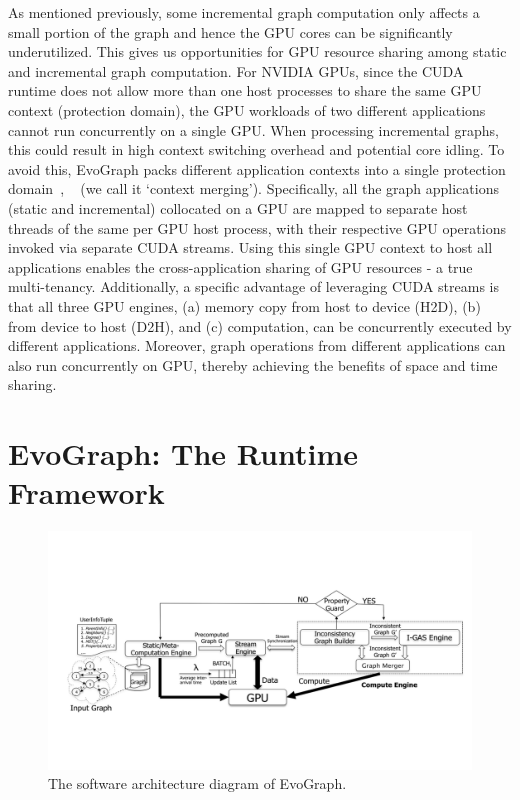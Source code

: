 As mentioned previously, some incremental graph computation only affects a small portion of the graph and hence the GPU cores can be significantly underutilized. This gives us opportunities for GPU resource sharing among static and incremental graph computation. For NVIDIA GPUs, since the CUDA runtime does not allow more than one host processes to share the same GPU context (protection domain), the GPU workloads of two different applications cannot run concurrently on a single GPU. When processing incremental graphs, this could result in high context switching overhead and potential core idling. To avoid this, EvoGraph packs different application contexts into a single protection domain~\cite{Rain}, ~\cite{Strings} (we call it `context merging'). Specifically, all the graph applications (static and incremental) collocated on a GPU are mapped to separate host threads of the same per GPU host process, with their respective GPU operations invoked via separate CUDA streams. Using this single GPU context to host all applications enables the cross-application sharing of GPU resources - a true multi-tenancy. Additionally, a specific advantage of leveraging CUDA streams is that all three GPU engines, (a) memory copy from host to device (H2D), (b) from device to host (D2H), and (c) computation, can be concurrently executed by different applications. Moreover, graph operations from different applications can also run concurrently on GPU, thereby achieving the benefits of space and time sharing. 


\section{EvoGraph: The Runtime Framework}

\begin{figure}[!t]
\centering
\includegraphics[width=\textwidth,height=\textheight,keepaspectratio]{figures/framework.pdf}
\caption{The software architecture diagram of EvoGraph.}
\label{fig:framework}
\end{figure}


